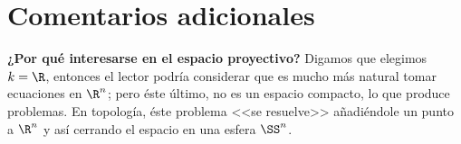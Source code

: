 \documentclass[11pt, reqno]{amsart}
\begin{document}


\section{Comentarios adicionales}
\textbf{¿Por qué interesarse en el espacio proyectivo?}
Digamos que elegimos $k = \R$, entonces el lector podría considerar que es mucho más natural tomar ecuaciones en $\R^n$;
pero éste último, no es un espacio compacto, lo que produce problemas.
En topología, éste problema <<se resuelve>> añadiéndole un punto a $\R^n$ y así cerrando el espacio en una esfera $\SS^n$.
\end{document}
